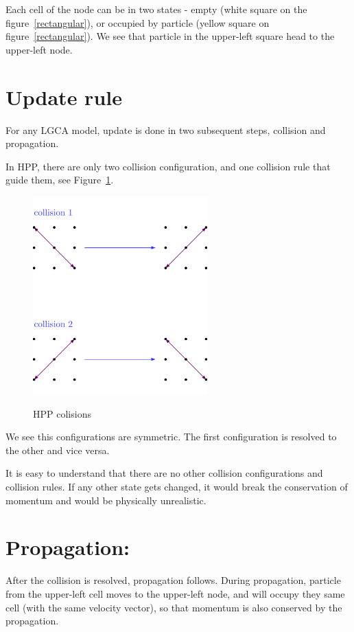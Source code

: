 Each cell of the node can be in two states - empty (white square on the figure~\ref{rectangular}), or occupied by particle (yellow square on figure~\ref{rectangular}).
We see that particle in the upper-left square head to the upper-left node.


\section{Update rule}
For any LGCA model, update is done in two subsequent steps, collision and propagation.

In HPP, there are only two collision configuration, and one collision rule that guide them, see Figure~\ref{hpp-colision}.

\begin{figure}
 \centering
 \includegraphics[width=0.6\textwidth]{./img/hpp_col}
 \label{hpp-colision}
 \caption{HPP colisions}
\end{figure}

We see this configurations are symmetric. The first configuration is resolved to the other and vice versa.

It is easy to understand that there are no other collision configurations and collision rules. If any other state gets changed, it would break the conservation of momentum and would be physically unrealistic.

\section{Propagation:}

After the collision is resolved, propagation follows.
During propagation, particle from the upper-left cell moves to the upper-left node, and will occupy they same cell (with the same velocity vector), so that momentum is also conserved by the propagation.

